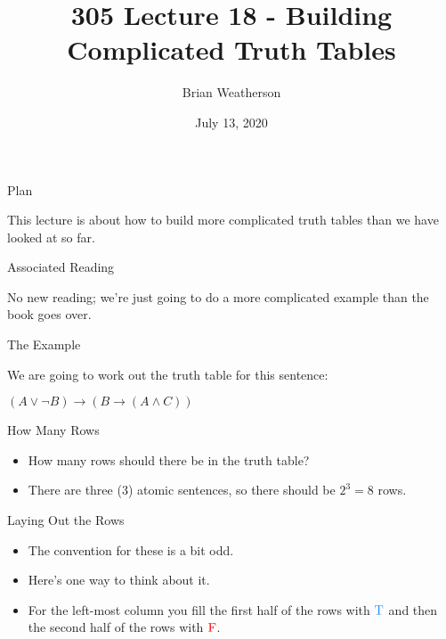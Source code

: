 \documentclass[
  ignorenonframetext,
]{beamer}
\title{305 Lecture 18 - Building Complicated Truth Tables}
\author{Brian Weatherson}
\date{July 13, 2020}
\providecommand{\tightlist}{%
  \setlength{\itemsep}{0pt}\setlength{\parskip}{0pt}}
\renewcommand{\,}{\text{, }}
\renewenvironment*{quote}	
	{\list{}{\rightmargin   \leftmargin} \item } 	
	{\endlist }
\def\True{\textcolor{dodgerblue}{\text{T}}}
\def\False{\textcolor{red}{\text{F}}}
\begin{document}
\frame{\titlepage}

\begin{frame}{Plan}
\protect\hypertarget{plan}{}

This lecture is about how to build more complicated truth tables than we
have looked at so far.

\end{frame}

\begin{frame}{Associated Reading}
\protect\hypertarget{associated-reading}{}

No new reading; we're just going to do a more complicated example than
the book goes over.

\end{frame}

\begin{frame}{The Example}
\protect\hypertarget{the-example}{}

We are going to work out the truth table for this sentence:

\begin{quote}
\((A \vee \neg B) \rightarrow (B \rightarrow (A \wedge C))\)
\end{quote}

\end{frame}

\begin{frame}{How Many Rows}
\protect\hypertarget{how-many-rows}{}

\begin{itemize}[<+->]
\tightlist
\item
  How many rows should there be in the truth table?
\item
  There are three (3) atomic sentences, so there should be \(2^3 = 8\)
  rows.
\end{itemize}

\end{frame}

\begin{frame}{Laying Out the Rows}
\protect\hypertarget{laying-out-the-rows}{}

\begin{itemize}
\tightlist
\item
  The convention for these is a bit odd.
\item
  Here's one way to think about it.
\item
  For the left-most column you fill the first half of the rows with
  \(\True\) and then the second half of the rows with \(\False\).
\end{itemize}

\end{frame}
\end{document}

